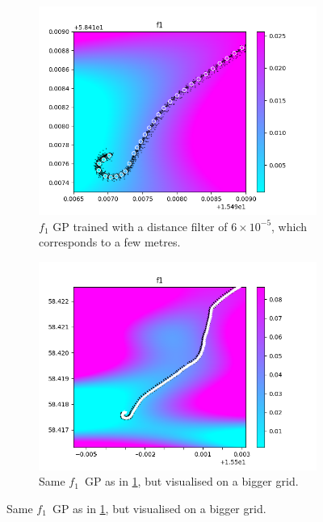\begin{figure}
    \centering
    \begin{subfigure}[b]{0.475\textwidth}
        \centering
        \includegraphics[width=\textwidth]{figures/f1_gp/f1_gp_6e-5_filter}
        \caption[Segment1]%
        {{\small $f_1$ GP trained with a distance filter of $6\times10^{-5}$, which corresponds to a few metres.}}    
        \label{fig:f1-gp-1}
    \end{subfigure}
    \hfill
    \begin{subfigure}[b]{0.475\textwidth}  
        \centering 
        \includegraphics[width=\textwidth]{figures/f1_gp/f1_gp_middle}
        \caption[]%
        {{\small Same $f_1$ GP as in \ref{fig:f1-gp-1}, but visualised on a bigger grid.}}    

\end{subfigure}
\end{figure}

